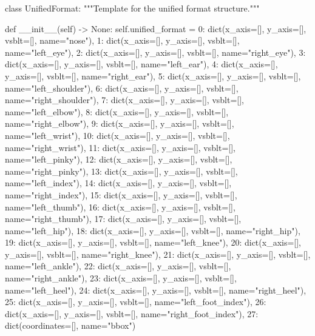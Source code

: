\startPY
class UnifiedFormat:
    """Template for the unified format structure."""

    def __init__(self) -> None:
        self.unified_format = {
        0: dict(x_axis=[], y_axis=[], vsblt=[], name="nose"),
        1: dict(x_axis=[], y_axis=[], vsblt=[], name="left_eye"),
        2: dict(x_axis=[], y_axis=[], vsblt=[], name="right_eye"),
        3: dict(x_axis=[], y_axis=[], vsblt=[], name="left_ear"),
        4: dict(x_axis=[], y_axis=[], vsblt=[], name="right_ear"),
        5: dict(x_axis=[], y_axis=[], vsblt=[], name="left_shoulder"),
        6: dict(x_axis=[], y_axis=[], vsblt=[], name="right_shoulder"),
        7: dict(x_axis=[], y_axis=[], vsblt=[], name="left_elbow"),
        8: dict(x_axis=[], y_axis=[], vsblt=[], name="right_elbow"),
        9: dict(x_axis=[], y_axis=[], vsblt=[], name="left_wrist"),
        10: dict(x_axis=[], y_axis=[], vsblt=[], name="right_wrist"),
        11: dict(x_axis=[], y_axis=[], vsblt=[], name="left_pinky"),
        12: dict(x_axis=[], y_axis=[], vsblt=[], name="right_pinky"),
        13: dict(x_axis=[], y_axis=[], vsblt=[], name="left_index"),
        14: dict(x_axis=[], y_axis=[], vsblt=[], name="right_index"),
        15: dict(x_axis=[], y_axis=[], vsblt=[], name="left_thumb"),
        16: dict(x_axis=[], y_axis=[], vsblt=[], name="right_thumb"),
        17: dict(x_axis=[], y_axis=[], vsblt=[], name="left_hip"),
        18: dict(x_axis=[], y_axis=[], vsblt=[], name="right_hip"),
        19: dict(x_axis=[], y_axis=[], vsblt=[], name="left_knee"),
        20: dict(x_axis=[], y_axis=[], vsblt=[], name="right_knee"),
        21: dict(x_axis=[], y_axis=[], vsblt=[], name="left_ankle"),
        22: dict(x_axis=[], y_axis=[], vsblt=[], name="right_ankle"),
        23: dict(x_axis=[], y_axis=[], vsblt=[], name="left_heel"),
        24: dict(x_axis=[], y_axis=[], vsblt=[], name="right_heel"),
        25: dict(x_axis=[], y_axis=[], vsblt=[], name="left_foot_index"),
        26: dict(x_axis=[], y_axis=[], vsblt=[], name="right_foot_index"),
        27: dict(coordinates=[], name="bbox")
        }
\stopPY
\stopbuffer
